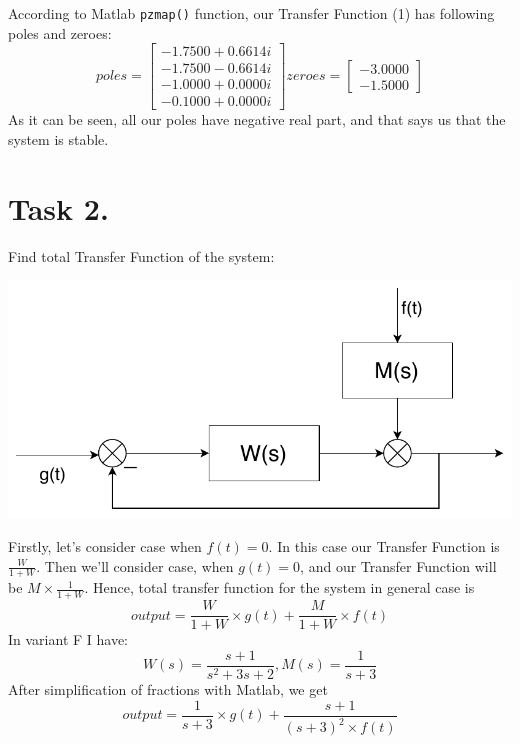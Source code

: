 \documentclass[a4paper,12pt]{article}
\begin{document}
    According to Matlab \texttt{pzmap()} function, our Transfer Function (1) has following poles 
    and zeroes:
    \begin{equation*}
    poles =
    \begin{bmatrix}
      -1.7500 + 0.6614i\\
      -1.7500 - 0.6614i\\
      -1.0000 + 0.0000i\\
      -0.1000 + 0.0000i
    \end{bmatrix} 
    zeroes =
    \begin{bmatrix}
        -3.0000\\
        -1.5000
    \end{bmatrix}
    \end{equation*}
    As it can be seen, all our poles have negative real part, and that says us 
    that the system is stable.
\newpage
\section{Task 2.}
    Find total Transfer Function of the system:
    \begin{center}
        \includegraphics[scale=0.5]{../Task2/ToReport/System.pdf}
    \end{center}
    Firstly, let's consider case when $f(t)=0$. In this case our Transfer
    Function is $\frac{W}{1+W}$. Then we'll consider case, when $g(t)=0$, 
    and our Transfer Function will be $M \times \frac{1}{1+W}$.
    Hence, total transfer function for the system in general case is
    \begin{equation*}
        output = \frac{W}{1+W} \times g(t) + \frac{M}{1+W} \times f(t)
    \end{equation*}  
    In variant F I have:
    \begin{equation*}
    W(s) = \frac{s+1}{s^2+3s+2}, 
    M(s) = \frac{1}{s+3}
    \end{equation*}
    After simplification of fractions with Matlab, we get 
    \begin{equation*}
        output = \frac{1}{s+3} \times g(t) + \frac{s+1}{(s+3)^2 \times f(t)}
    \end{equation*}
\end{document}
